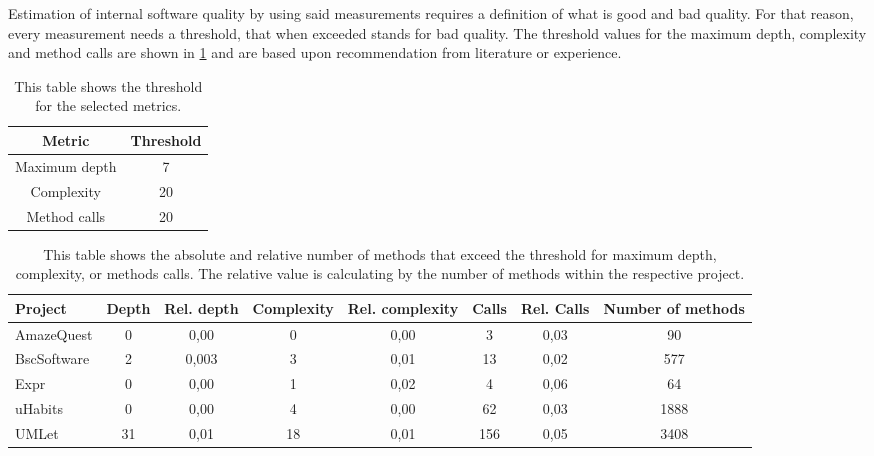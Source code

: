 \documentclass[conference]{IEEEtran}
\begin{document}
Estimation of internal software quality by using said measurements requires a definition of what is good and bad quality. For that reason, every measurement needs a threshold, that when exceeded stands for bad quality. The threshold values for the maximum depth, complexity and method calls are shown in \cref{tbl:thresholds} and are based upon recommendation from literature or experience.
\begin{table}
\centering
    \begin{tabular}{c c}
         Metric         & Threshold    \\ \hline
         Maximum depth  & 7             \\
         Complexity     & 20            \\
         Method calls   & 20            \\
    \end{tabular}
    \caption[Thresholds]{This table shows the threshold for the selected metrics.}
    \label{tbl:thresholds}
\end{table}

\begin{table}
\centering
\begin{tabular}{l|c c c c c c c}
	Project     & Depth & Rel. depth & Complexity & Rel. complexity & Calls & Rel. Calls & Number of methods \\ \hline
	AmazeQuest  &   0   & 0,00       & 0          & 0,00            & 3     & 0,03       & 90                \\
	BscSoftware &   2   & 0,003      & 3          & 0,01            & 13    & 0,02       & 577               \\
	Expr        &   0   & 0,00       & 1          & 0,02            & 4     & 0,06       & 64                \\
	uHabits     &   0   & 0,00       & 4          & 0,00            & 62    & 0,03       & 1888              \\
	UMLet       &  31   & 0,01       & 18         & 0,01            & 156   & 0,05       & 3408
\end{tabular} 
\caption[Threshold exceeding methods]{This table shows the absolute and relative number of methods that exceed the threshold for maximum depth, complexity, or methods calls. The relative value is calculating by the number of methods within the respective project.}
\label{tbl:exceed}
\end{table}
\end{document}
